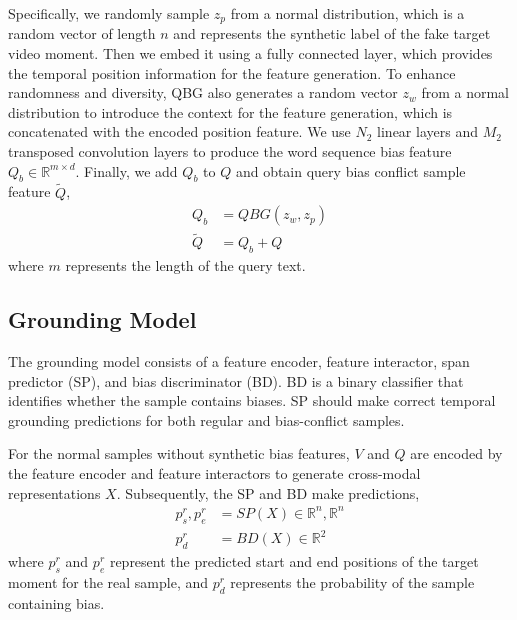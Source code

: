 Specifically, we randomly sample $z_p$ from a normal distribution, which is a random vector of length $n$ and represents the synthetic label of the fake target video moment. Then we embed it using a fully connected layer, which provides the temporal position information for the feature generation. 
To enhance randomness and diversity, QBG also generates a random vector $z_w$ from a normal distribution to introduce the context for the feature generation, which is concatenated with the encoded position feature. 
We use $N_2$ linear layers and $M_2$ transposed convolution layers to produce the word sequence bias feature $Q_b\in \mathbb{R}^{m \times d}$. Finally, we add $Q_b$ to $Q$ and obtain query bias conflict sample feature $\tilde{Q}$,
\begin{equation}
	\begin{split}
		Q_b &= QBG\left(z_w, z_p\right)\\ 
		\tilde{Q} &= Q_b + Q
	\end{split}
	\label{eq2}
\end{equation}
where $m$ represents the length of the query text.


\subsection{Grounding Model}

The grounding model consists of a feature encoder, feature interactor, span predictor (SP), and bias discriminator (BD). 
BD is a binary classifier that identifies whether the sample contains biases. 
SP should make correct temporal grounding predictions for both regular and bias-conflict samples. 

For the normal samples without synthetic bias features, $V$ and $Q$ are encoded by the feature encoder and feature interactors to generate cross-modal representations $X$. Subsequently, the SP and BD make predictions, 
\begin{equation}
	\begin{split}
		p_{s}^r, p_{e}^r &= SP(X) \in \mathbb{R}^{n}, \mathbb{R}^{n}\\
		p_{d}^r &= BD(X) \in \mathbb{R}^{2}
	\end{split}
	\label{eq3}
\end{equation}
where $p_{s}^r$ and $p_{e}^r$ represent the predicted start and end positions of the target moment for the real sample, and $p_{d}^r$ represents the probability of the sample containing bias.

